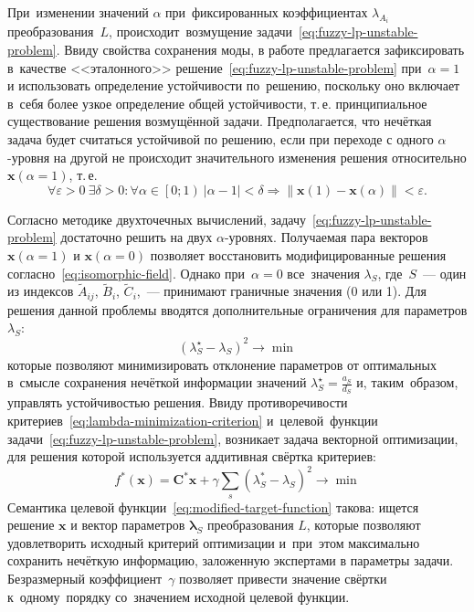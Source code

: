 При~изменении значений $\alpha$ при~фиксированных коэффициентах $\lambda_{A_i}$ преобразования~$L$, происходит~возмущение задачи~\eqref{eq:fuzzy-lp-unstable-problem}. Ввиду свойства сохранения моды, в работе предлагается зафиксировать в~качестве <<эталонного>> решение~\eqref{eq:fuzzy-lp-unstable-problem} при~$\alpha=1$ и использовать определение устойчивости по~решению, поскольку оно включает в~себя более узкое определение общей устойчивости, т.\,е. принципиальное существование решения возмущённой задачи. Предполагается, что нечёткая задача будет считаться устойчивой по решению, если при переходе с одного $\alpha$-уровня на другой не происходит значительного изменения решения относительно $\mathbf{x}\left( \alpha =1 \right)$, т.\,е.
\begin{equation}
\label{eq:fuzzy-solution-stability}
  \forall \varepsilon >0\ \exists \delta >0:\forall \alpha \in \left[0; 1\right)\ \left| \alpha -1 \right|<\delta \Rightarrow \left\| \mathbf{x}\left( 1 \right)-\mathbf{x}\left( \alpha  \right) \right\|<\varepsilon.
\end{equation}

Согласно методике двухточечных вычислений, задачу~\eqref{eq:fuzzy-lp-unstable-problem} достаточно решить на двух $\alpha$-уровнях. Получаемая пара векторов $\mathbf{x}\left( \alpha =1 \right)$ и $\mathbf{x}\left( \alpha =0 \right)$ позволяет восстановить модифицированные решения согласно~\eqref{eq:isomorphic-field}. Однако при~$\alpha=0$ все~значения $\lambda_S$, где~$S$~--- один из индексов $\tilde A_{ij}$, $\tilde B_i$, $\tilde C_i$,~--- принимают граничные значения (0 или 1). Для решения данной проблемы вводятся дополнительные ограничения для параметров $\lambda_S$:
\begin{equation}
\label{eq:lambda-minimization-criterion}
  {\left( \lambda_{S}^{\star}-\lambda_S \right)}^2\to \min
\end{equation}
которые позволяют минимизировать отклонение параметров от оптимальных в~смысле сохранения нечёткой информации значений $\displaystyle \lambda_{S}^{\star}=\frac{a_S}{d_S}$ и, таким~образом, управлять устойчивостью решения. Ввиду противоречивости критериев~\eqref{eq:lambda-minimization-criterion} и~целевой~функции задачи~\eqref{eq:fuzzy-lp-unstable-problem}, возникает задача векторной оптимизации, для решения которой используется аддитивная свёртка критериев:
\begin{equation}
\label{eq:modified-target-function}
  f^{*}\left( \mathbf{x} \right)=\mathbf{C}^{*}\mathbf{x}+\gamma \sum\limits_{s}^{}{\left(\lambda_{S}^{*}-\lambda_S \right)}^{2} \to \min
\end{equation}
Семантика целевой функции~\eqref{eq:modified-target-function} такова: ищется решение $\mathbf{x}$ и вектор параметров $\mathbf{\lambda}_S$ преобразования $L$, которые позволяют удовлетворить исходный критерий оптимизации и~при~этом максимально сохранить нечёткую информацию, заложенную экспертами в параметры задачи. Безразмерный коэффициент~$\gamma$ позволяет привести значение свёртки к~одному~порядку со~значением исходной целевой функции.

